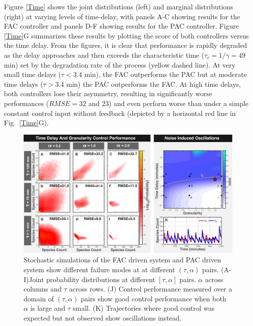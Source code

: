 \documentclass[12pt]{iopart}
\begin{document}
Figure \ref{Time} shows the joint distributions (left) and marginal distributions (right) at varying levels of time-delay, with panels A-C showing results for the FAC controller and panels D-F showing results for the PAC controller. Figure \ref{Time}G summarizes these results by plotting the score of both controllers versus the time delay. From the figures, it is clear that performance is rapidly degraded as the delay approaches and then exceeds the characteristic time ($\tau_c = 1 / \gamma = 49$ min) set by the degradation rate of the process (yellow dashed line). At very small time delays ($\tau< 3.4$ min), the FAC outperforms the PAC  but at moderate time delays ($\tau > 3.4$ min) the PAC outperforms the FAC.
%
At high time delays, both controllers lose their asymmetry, resulting in significantly worse performances ($RMSE = 32$ and $23$) and even perform worse than under a simple constant control input without feedback (depicted by a horizontal red line in Fig.\ \ref{Time}G). 

\begin{figure}
\begin{center}
\includegraphics[width=1\textwidth]{DelayAndGranularity.pdf}
\vspace{-0.1in}
\caption{Stochastic simulations of the FAC driven system and PAC driven system show different failure modes at at different $(\tau,\alpha)$ pairs. (A-I)Joint probability distributions at different $[\tau,\alpha]$ pairs. $\alpha$ across columns and $\tau$ across rows. (J) Control performance measured over a domain of $(\tau,\alpha)$ pairs show good control performance when both $\alpha$ is large and $\tau$ small. 
(K) Trajectories where good control was expected but not observed show oscillations instead.}
\label{DG}
\end{center}
\vspace{-0.2in}
\end{figure}
\end{document}
